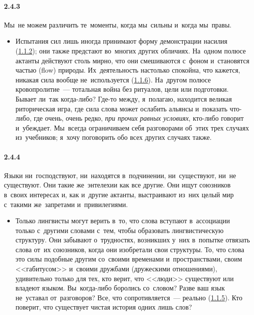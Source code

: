 \paragraph{2.4.3}\hypertarget{par:2.4.3}{} Мы~не можем различить те~моменты, когда мы~сильны и~когда мы~правы. 
	\begin{itemize}
	\item 
	Испытания сил лишь иногда принимают форму демонстрации насилия (\hyperlink{par:1.1.2}{1.1.2}); они также предстают во~многих других обличиях. На~одном полюсе актанты действуют столь мирно, что они смешиваются с~фоном и~становятся частью (flow) природы. Их~деятельность настолько спокойна, что кажется, никакая сила вообще не~используется (\hyperlink{par:1.1.6}{1.1.6}). На~другом полюсе кровопролитие~--- тотальная война без ритуалов, цели или подготовки. Бывает ли~так когда-либо? Где-то между, я~полагаю, находится великая риторическая игра, где сила слова может ослабить альянсы и~показать что-либо, где очень, очень редко, {\itshape при прочих равных условиях}, кто-либо говорит и~убеждает. Мы~всегда ограничиваем себя разговорами об~этих трех случаях из~учебников; я~хочу поговорить обо всех других случаях также.
	\end{itemize}

\paragraph{2.4.4}\hypertarget{par:2.4.4}{} Языки ни~господствуют, ни~находятся в~подчинении, ни~существуют, ни~не существуют. Они такие же~энтелехии как все другие. Они ищут союзников в~своих интересах и, как и~другие актанты, выстраивают из~них целый мир с~такими же~запретами и~привилегиями.
	\begin{itemize}
	\item 
	Только лингвисты могут верить в~то, что слова вступают в~ассоциации только с~другими словами с~тем, чтобы образовать лингвистическую структуру. Они забывают о~трудностях, возникших у~них в~попытке отвязать слова от~их союзников, когда они изобретали свои структуры. То, что слова это силы подобные другим со~своими временами и~пространствами, своим <<габитусом>> и~своими дружбами (дружескими отношениями), удивительно только для тех, кто верит, что <<люди>> существуют или владеют языком. Вы~когда-либо боролись со~словом? Разве ваш язык не~уставал от~разговоров? Все, что сопротивляется~--- реально (\hyperlink{par:1.1.5}{1.1.5}). Кто поверит, что существует чистая история одних лишь слов?
	\end{itemize}


